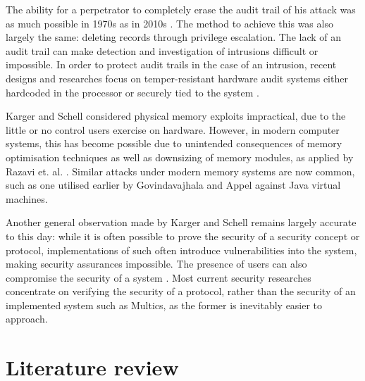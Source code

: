 \documentclass[11pt]{article}
\begin{document}
The ability for a perpetrator to completely erase the audit trail of his attack was as much possible in 1970s \cite[3.4.4]{karger1974multics} as in 2010s \cite[VI. C.]{koscher2010experimental}. The method to achieve this was also largely the same: deleting records through privilege escalation. The lack of an audit trail can make detection and investigation of intrusions difficult or impossible. In order to protect audit trails in the case of an intrusion, recent designs and researches focus on temper-resistant hardware audit systems either hardcoded in the processor \cite{bordsen1993cache} or securely tied to the system \cite{chong2003secure}.

Karger and Schell considered physical memory exploits impractical, due to the little or no control users exercise on hardware. However, in modern computer systems, this has become possible due to unintended consequences of memory optimisation techniques as well as downsizing of memory modules, as applied by Razavi et. al. \cite{razavi2016flip}. Similar attacks under modern memory systems are now common, such as one utilised earlier by Govindavajhala and Appel \cite{govindavajhala2003using} against Java virtual machines.

Another general observation made by Karger and Schell \cite[3.3.1]{karger1974multics} remains largely accurate to this day: while it is often possible to prove the security of a security concept or protocol, implementations of such often introduce vulnerabilities into the system, making security assurances impossible. The presence of users can also compromise the security of a system \cite{adams1999users}. Most current security researches concentrate on verifying the security of a protocol, rather than the security of an implemented system such as Multics, as the former is inevitably easier to approach.

\section{Literature review}


\footnotesize{}
\end{document}
